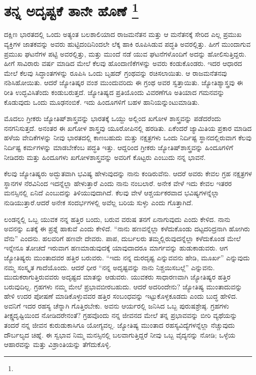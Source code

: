 
\chapter[ತನ್ನ ಅದೃಷ್ಟಕೆ ತಾನೇ ಹೊಣೆ ]{ತನ್ನ ಅದೃಷ್ಟಕೆ ತಾನೇ ಹೊಣೆ \protect\footnote{}}

ದಕ್ಷಿಣ ಭಾರತದಲ್ಲಿ ಒಂದು ಅತ್ಯಂತ ಬಲಶಾಲಿಯಾದ ರಾಜಮನೆತನ ಮತ್ತು ಆ ಮನೆತನಕ್ಕೆ ಸೇರಿದ ಎಲ್ಲ ಪ್ರಮುಖ ವ್ಯಕ್ತಿಗಳ ಜಾತಕವನ್ನು ಅವರು ಹುಟ್ಟಿದಂದಿನಿಂದಲೇ ಲೆಕ್ಕ ಹಾಕಿ ರೂಪಿಸಿಡುವ ಪದ್ಧತಿ ಅವರಲ್ಲಿತ್ತು. ಹೀಗೆ ಮುಂದಾಗುವ ಪ್ರಮುಖ ಘಟನೆಗಳ ಪಟ್ಟಿ ಅವರಲ್ಲಿತ್ತು, ಮತ್ತು ಮುಂದೆ ನಡೆ ಯುವ ಘಟನೆಗಳೊಂದಿಗೆ ಅದನ್ನು ಹೋಲಿಸುತ್ತಿದ್ದರು. ಹೀಗೆ ಸಾವಿರಾರು ವರ್ಷ ಮಾಡಿದ ಮೇಲೆ ಕೆಲವು ಹೊಂದಾಣಿಕೆಗಳನ್ನು ಅವರು ಕಂಡುಕೊಂಡರು. ಇದರ ಆಧಾರದ ಮೇಲೆ ಕೆಲವು ಸಿದ್ಧಾಂತಗಳನ್ನು ರೂಪಿಸಿ ಒಂದು ಬೃಹದ್​ ಗ್ರಂಥವನ್ನು ರಚಿಸಲಾಯಿತು. ಆ ರಾಜಮನೆತನವು ನಶಿಸಿಹೋಯಿತು. ಆದರೆ ಜ್ಯೋತಿಷ್ಕರ ವಂಶ ಮುಂದುವರಿದು ಈ ಗ್ರಂಥ ಅವರ ಸ್ವತ್ತಾಯಿತು. ಜ್ಯೋತಿಶ್ಯಾಸ್ತ್ರವು ಈ ರೀತಿ ಉದ್ಭವಿಸಿತೆಂದು ಕಂಡುಬರುತ್ತದೆ. ಜ್ಯೋತಿಷ್ಯದ ಪ್ರತಿಯೊಂದು ವಿವರಣೆಗೂ ಅತಿಯಾದ ಗಮನವನ್ನು ಕೊಡುವುದು ಒಂದು ಮೂಢನಂಬಿಕೆ. ಇದು ಹಿಂದೂಗಳಿಗೆ ಬಹಳ ಹಾನಿಯನ್ನುಂಟುಮಾಡಿತು.

ಮೊದಲು ಗ್ರೀಕರು ಜ್ಯೋತಿಷ್​ಶಾಸ್ತ್ರವನ್ನು ಭಾರತಕ್ಕೆ ಒಯ್ದು ಅಲ್ಲಿಂದ ಖಗೋಳ ಶಾಸ್ತ್ರವನ್ನು ಪಡೆದರೆಂದು ನನಗನಿಸುತ್ತದೆ. ಅನಂತರ ಈ ಖಗೋಳ ಶಾಸ್ತ್ರವು ಯೂರೋಪಿನಲ್ಲಿ ಹರಡಿತು. ಏಕೆಂದರೆ ಜ್ಯಾಮಿತಿಯ ಪ್ರಕಾರ ಮಾಡಿದ ಹಳೆಯ ವೇದಿಕೆಗಳನ್ನು ನೀವು ಭಾರತದಲ್ಲಿ ಕಾಣಬಹುದು ಮತ್ತು ನಕ್ಷತ್ರಗಳು ಒಂದು ನಿರ್ದಿಷ್ಟ ಸ್ಥಾನದಲ್ಲಿರುವಾಗ ಕೆಲವು ನಿರ್ದಿಷ್ಟ ಕರ್ಮಗಳನ್ನು ಮಾಡಬೇಕೆಂಬ ಪದ್ಧತಿ ಇತ್ತು. ಆದ್ದರಿಂದ ಗ್ರೀಕರು ಜ್ಯೋತಿಷ್​ಶಾಸ್ತ್ರವನ್ನು ಹಿಂದೂಗಳಿಗೆ ನೀಡಿದರು ಮತ್ತು ಹಿಂದೂಗಳು ಖಗೋಳಶಾಸ್ತ್ರವನ್ನು ಅವರಿಗೆ ಕೊಟ್ಟರು ಎಂಬುದು ನನ್ನ ಭಾವನೆ.

ಕೆಲವು ಜ್ಯೋತಿಷ್ಯರು ಅದ್ಭುತವಾಗಿ ಭವಿಷ್ಯ ಹೇಳುವುದನ್ನು ನಾನು ಕಂಡಿರುವೆನು. ಆದರೆ ಅವರು ಕೇವಲ ಗ್ರಹ ನಕ್ಷತ್ರಗಳ ಸ್ಥಾನಗಳ ನೆರವಿನಿಂದ ಇದನ್ನೆಲ್ಲಾ ಹೇಳುತ್ತಾರೆ ಎಂದು ನಾನು ನಂಬಲಾರೆ. ಅನೇಕ ವೇಳೆ ಇದು ಕೇವಲ ಇತರರ ಮನಸ್ಸಿನಲ್ಲಿ ಏನಿದೆ ಎಂಬುದನ್ನು ತಿಳಿಯುವುದಾಗಿದೆ. ಕೆಲವು ವೇಳೆ ಆಶ್ಚರ್ಯಕರವಾದ ಭವಿಷ್ಯಗಳನ್ನೆಲ್ಲಾ ನುಡಿಯುತ್ತಾರೆ.ಆದರೆ ಅನೇಕ ಸಂದರ್ಭಗಳಲ್ಲಿ ಅವೆಲ್ಲ ಬರಿಯ ಸುಳ್ಳು ಎಂದು ಗೊತ್ತಾಗಿದೆ.

ಲಂಡನ್ನಲ್ಲಿ ಒಬ್ಬ ಯುವಕ ನನ್ನ ಹತ್ತಿರ ಬಂದು, ಬರುವ ವರುಷ ತನಗೆ ಏನಾಗುವುದು ಎಂದು ಕೇಳಿದ. ನಾನು ಅವನನ್ನು ಏತಕ್ಕೆ ಈ ಪ್ರಶ್ನೆ ಹಾಕುವೆ ಎಂದು ಕೇಳಿದೆ. “ನಾನು ಹಣವನ್ನೆಲ್ಲಾ ಕಳೆದುಕೊಂಡು ದಟ್ಟದರಿದ್ರನಾಗಿ ಹೋಗಿರು ವೆನು” ಎಂದನು. ಹಲವರಿಗೆ ಹಣವೇ ದೇವರು. ಪಾಪ, ದುರ್ಬಲರು ತಮ್ಮಲ್ಲಿರುವುದನ್ನೆಲ್ಲಾ ಕಳೆದುಕೊಂಡ ಮೇಲೆ ಇನ್ನೇನೂ ತೋಚದೆ ಇರುವಾಗ ಹಣಮಾಡುವುದಕ್ಕೆ ಯಾವುದಾದರೂ ಮಾರ್ಗವನ್ನು ಹುಡುಕಾಡುವರು. ಆಗ ಜ್ಯೋತಿಷ್ಯರು ಮುಂತಾದವರ ಹತ್ತಿರ ಬರುವರು. “ಇದು ನನ್ನ ದುರದೃಷ್ಟ ಎನ್ನುವವನು ಹೇಡಿ, ಮೂರ್ಖ” ಎನ್ನುವುದು ನಮ್ಮ ಸಂಸ್ಕೃತ ಗಾದೆಯೊಂದು. ಆದರೆ ಧೀರ “ನನ್ನ ಅದೃಷ್ಟವನ್ನು ನಾನು ನಿಶ್ಚಯಿಸಬಲ್ಲೆ” ಎನ್ನುವನು. ಮುದುಕರಾಗುತ್ತಿರುವವರು ಅದೃಷ್ಟದ ಮಾತನ್ನು ಆಡುವರು. ಯುವಕರು ಸಾಧಾರಣವಾಗಿ ಜ್ಯೋತಿಷ್ಯರ ಹತ್ತಿರ ಬರುವುದಿಲ್ಲ. ಗ್ರಹಗಳು ನಮ್ಮ ಮೇಲೆ ಪ್ರಭಾವಬೀರಬಹುದು. ಆದರೆ ಅದರಿಂದೇನು? ಜ್ಯೋತಿಷ್ಯ ಮುಂತಾದುವನ್ನು ಹೇಳಿ ಉದರ ಪೋಷಣೆ ಮಾಡಿಕೊಳ್ಳುವವರ ಹತ್ತಿರ ಸಂಬಂಧವನ್ನು ಇಟ್ಟುಕೊಳ್ಳಕೂಡದು ಎಂದು ಬುದ್ಧ ಹೇಳಿದ. ಅವನಿಗೆ ಇದರ ರಹಸ್ಯ ಚೆನ್ನಾಗಿ ಗೊತ್ತಿರಬೇಕು. ಅವನು ಆರ್ಯರಲ್ಲಿ ಜನಿಸಿದ ಒಬ್ಬ ಪುರುಷಶ್ರೇಷ್ಠ. ಗ್ರಹಗಳು ತೀಕ್ಷ್ಣದೃಷ್ಟಿಯಿಂದ ನೋಡಿದರೇನಂತೆ? ಗ್ರಹವೊಂದು ನನ್ನ ಜೀವನದ ಮೇಲೆ ತನ್ನ ಪ್ರಭಾವವನ್ನು ಬೀರಿ ವ್ಯಥೆಯನ್ನು ತಂದರೆ ನನ್ನ ಜೀವನ ಕುರುಡುಕಾಸಿಗೂ ಯೋಗ್ಯವಲ್ಲ. ಜ್ಯೋತಿಷ್ಯ ಮುಂತಾದ ರಹಸ್ಯವಿದ್ಯೆಗಳನ್ನೆಲ್ಲಾ ನೆಚ್ಚುವುದು ದೌರ್ಬಲ್ಯದ ಚಿಹ್ನೆ. ಈ ಸ್ವಭಾವ ನಿಮ್ಮ ಮನಸ್ಸಿನಲ್ಲಿ ಬಲವಾಗುತ್ತಿದ್ದರೆ ನೀವು ಒಬ್ಬ ವೈದ್ಯನನ್ನು ನೋಡಿ; ಒಳ್ಳೆಯ ಆಹಾರವನ್ನು ಮತ್ತು ವಿಶ್ರಾಂತಿಯನ್ನು ತೆಗೆದುಕೊಳ್ಳಿ.

